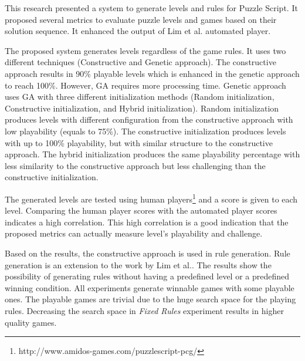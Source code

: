 This research presented a system to generate levels and rules for Puzzle Script. It proposed several metrics to evaluate puzzle levels and games based on their solution sequence. It enhanced the output of Lim et al. automated player\cite{puzzleScriptGeneration}.\\\par

The proposed system generates levels regardless of the game rules. It uses two different techniques (Constructive and Genetic approach). The constructive approach results in 90\% playable levels which is enhanced in the genetic approach to reach 100\%. However, GA requires more processing time. Genetic approach uses GA with three different initialization methods (Random initialization, Constructive initialization, and Hybrid initialization). Random initialization produces levels with different configuration from the constructive approach with low playability (equals to 75\%).  The constructive initialization produces levels with up to 100\% playability, but with similar structure to the constructive approach. The hybrid initialization produces the same playability percentage with less similarity to the constructive approach but less challenging than the constructive initialization.\\\par

The generated levels are tested using human players\footnote{http://www.amidos-games.com/puzzlescript-pcg/} and a score is given to each level. Comparing the human player scores with the automated player scores indicates a high correlation. This high correlation is a good indication that the proposed metrics can actually measure level's playability and challenge.\\\par

Based on the results, the constructive approach is used in rule generation. Rule generation is an extension to the work by Lim et al.\cite{puzzleScriptGeneration}. The results show the possibility of generating rules without having a predefined level or a predefined winning condition. All experiments generate winnable games with some playable ones. The playable games are trivial due to the huge search space for the playing rules. Decreasing the search space in \emph{Fixed Rules} experiment results in higher quality games.\\\par

